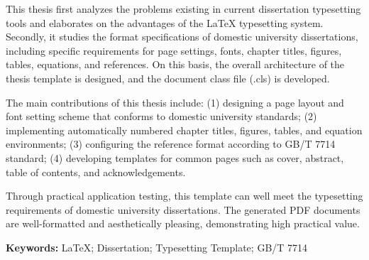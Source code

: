 This thesis first analyzes the problems existing in current dissertation typesetting tools and elaborates on the advantages of the LaTeX typesetting system. Secondly, it studies the format specifications of domestic university dissertations, including specific requirements for page settings, fonts, chapter titles, figures, tables, equations, and references. On this basis, the overall architecture of the thesis template is designed, and the document class file (.cls) is developed.

The main contributions of this thesis include: (1) designing a page layout and font setting scheme that conforms to domestic university standards; (2) implementing automatically numbered chapter titles, figures, tables, and equation environments; (3) configuring the reference format according to GB/T 7714 standard; (4) developing templates for common pages such as cover, abstract, table of contents, and acknowledgements.

Through practical application testing, this template can well meet the typesetting requirements of domestic university dissertations. The generated PDF documents are well-formatted and aesthetically pleasing, demonstrating high practical value.

\vspace{40pt}
\indent\textbf{Keywords:} LaTeX; Dissertation; Typesetting Template; GB/T 7714
